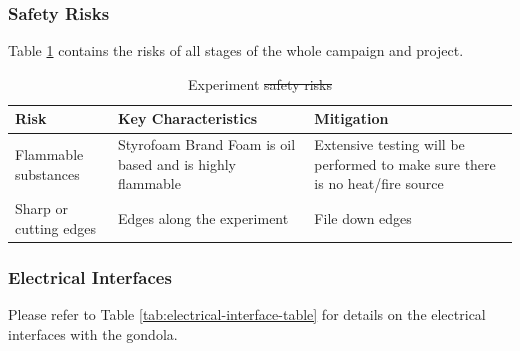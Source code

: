 \documentclass[a4paper,12pt,twoside, final]{article}
\providecommand{\DIFaddtex}[1]{{\protect\color{blue}\uwave{#1}}} %
\providecommand{\DIFdeltex}[1]{{\protect\color{red}\sout{#1}}}                      %
\providecommand{\DIFaddFL}[1]{\DIFadd{#1}} %
\providecommand{\DIFdelFL}[1]{\DIFdel{#1}} %
\providecommand{\DIFaddbeginFL}{} %
\providecommand{\DIFaddendFL}{} %
\providecommand{\DIFdelbeginFL}{} %
\providecommand{\DIFdelendFL}{} %
\providecommand{\DIFadd}[1]{\texorpdfstring{\DIFaddtex{#1}}{#1}} %
\providecommand{\DIFdel}[1]{\texorpdfstring{\DIFdeltex{#1}}{}} %
\newcommand{\DIFscaledelfig}{0.5}
\newlength{\DIFdelgraphicswidth} %
\newlength{\DIFdelgraphicsheight} %
\newcommand{\DIFaddincludegraphics}[2][]{{\color{blue}\fbox{\DIFOincludegraphics[#1]{#2}}}} %
\newcommand{\DIFdelincludegraphics}[2][]{%
\sbox{\DIFdelgraphicsbox}{\DIFOincludegraphics[#1]{#2}}%
\settoboxwidth{\DIFdelgraphicswidth}{\DIFdelgraphicsbox} %
\settoboxtotalheight{\DIFdelgraphicsheight}{\DIFdelgraphicsbox} %
\scalebox{\DIFscaledelfig}{%
\parbox[b]{\DIFdelgraphicswidth}{\usebox{\DIFdelgraphicsbox}\\[-\baselineskip] \rule{\DIFdelgraphicswidth}{0em}}\llap{\resizebox{\DIFdelgraphicswidth}{\DIFdelgraphicsheight}{%
\setlength{\unitlength}{\DIFdelgraphicswidth}%
\begin{picture}(1,1)%
\thicklines\linethickness{2pt} %
{\color[rgb]{1,0,0}\put(0,0){\framebox(1,1){}}}%
{\color[rgb]{1,0,0}\put(0,0){\line( 1,1){1}}}%
{\color[rgb]{1,0,0}\put(0,1){\line(1,-1){1}}}%
\end{picture}%
}\hspace*{3pt}}} %
} %
\DeclareRobustCommand{\DIFaddbeginFL}{\DIFOaddbeginFL \let\includegraphics\DIFaddincludegraphics} %
\DeclareRobustCommand{\DIFaddendFL}{\DIFOaddendFL \let\includegraphics\DIFOincludegraphics} %
\DeclareRobustCommand{\DIFdelbeginFL}{\DIFOdelbeginFL \let\includegraphics\DIFdelincludegraphics} %
\DeclareRobustCommand{\DIFdelendFL}{\DIFOaddendFL \let\includegraphics\DIFOincludegraphics} %
\begin{document}
\subsubsection{Safety Risks}
Table \ref{tab:safrisk} contains the risks of all stages of the whole campaign and project.
\begin{table}[H]
\centering

\begin{tabular}{|m{}|m{}|m{}|}
\hline
\textbf{Risk}          & \textbf{Key Characteristics}                              & \textbf{Mitigation}                                                           \\ \hline
Flammable substances    & Styrofoam Brand Foam is oil based and is highly flammable & Extensive testing will be performed to make sure there is no heat/fire source \\ \hline
Sharp or cutting edges & Edges along the experiment                                & File down edges                                                               \\ \hline
\end{tabular}
\caption{Experiment \DIFdelbeginFL \DIFdelFL{safety risks}\DIFdelendFL \DIFaddbeginFL \DIFaddFL{Safety Risks}\DIFaddendFL }
\label{tab:safrisk}
\end{table}
\raggedbottom

\pagebreak
\subsubsection{Electrical Interfaces}

Please refer to Table \ref{tab:electrical-interface-table} for details on the electrical interfaces with the gondola.
\end{document}
